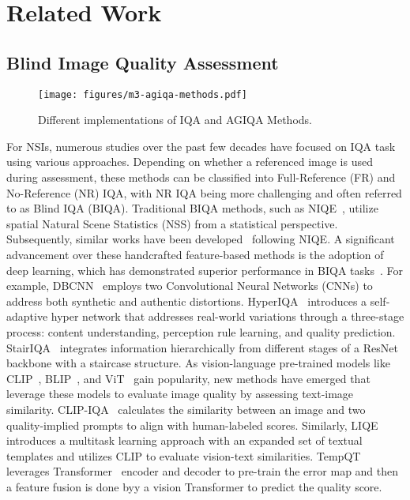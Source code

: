 
\section{Related Work} \label{sec:related}
\subsection{Blind Image Quality Assessment}
\begin{figure}
    \centering
    \texttt{[image: figures/m3-agiqa-methods.pdf]}
    \caption{Different implementations of IQA and AGIQA Methods.}
    \label{fig:related_work}
\end{figure}
For NSIs, numerous studies over the past few decades have focused on IQA task using various approaches. 
Depending on whether a referenced image is used during assessment, these methods can be classified into Full-Reference (FR) and No-Reference (NR) IQA, with NR IQA being more challenging and often referred to as Blind IQA (BIQA).
Traditional BIQA methods, such as NIQE~\cite{mittal2012making}, utilize spatial Natural Scene Statistics (NSS) from a statistical perspective. 
Subsequently, similar works have been developed~\cite{xue2014blind,zhang2014blind,zhang2015feature,xu2016blind} following NIQE.
A significant advancement over these handcrafted feature-based methods is the adoption of deep learning, which has demonstrated superior performance in BIQA tasks~\cite{hou2014blind,kang2014convolutional,zhang2018blind,yang2020ttl,yang2020blind,sun2022blind,zhu2022blind,sun2022graphiqa}.
For example, DBCNN~\cite{zhang2018blind} employs two Convolutional Neural Networks (CNNs) to address both synthetic and authentic distortions. 
HyperIQA~\cite{Su_2020_CVPR} introduces a self-adaptive hyper network that addresses real-world variations through a three-stage process: content understanding, perception rule learning, and quality prediction.
StairIQA~\cite{sun2022blind} integrates information hierarchically from different stages of a ResNet~\cite{he2016deep} backbone with a staircase structure.
As vision-language pre-trained models like CLIP~\cite{radford2021learning}, BLIP~\cite{li2022blip}, and ViT~\cite{dosovitskiy2020image} gain popularity, new methods have emerged that leverage these models to evaluate image quality by assessing text-image similarity.
CLIP-IQA~\cite{wang2023exploring} calculates the similarity between an image and two quality-implied prompts to align with human-labeled scores.
Similarly, LIQE~\cite{zhang2023blind} introduces a multitask learning approach with an expanded set of textual templates and utilizes CLIP to evaluate vision-text similarities. TempQT~\cite{shi2023blind} leverages Transformer~\cite{vaswani2017attention} encoder and decoder to pre-train the error map and then a feature fusion is done byy a vision Transformer to predict the quality score.

